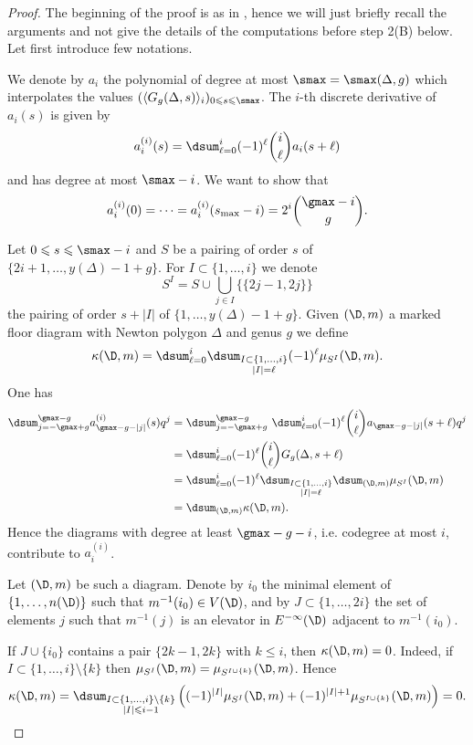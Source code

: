 \begin{proof}
The beginning of the proof is as in \cite[Theorem 1.7]{brugalle_polynomiality_2022}, hence we will just briefly recall the arguments and not give the details of the computations before step 2(B) below. Let first introduce few notations.

We denote by $a_i$ the polynomial of degree at most $\smax = \smax(\Delta,g)$ which interpolates the values $(\langle G_g(\Delta,s) \rangle_i)_{0 \leqslant s \leqslant \smax}$. The $i$-th discrete derivative of $a_i(s)$ is
given by
\[ a_i^{(i)}(s) = \dsum_{\ell=0}^i (-1)^\ell \binom{i}{\ell} a_i(s+\ell) \]
and has degree at most $\smax-i$. We want to show that 
\[ a_i^{(i)}(0) = \dots = a_i^{(i)}(s_{\max}-i) = 2^i \binom{\gmax-i}{g} .\]

	Let $0 \leqslant s \leqslant \smax-i$ and $S$ be a pairing of order $s$ of $\{ 2i+1,\dots,y(\Delta)-1+g \}$. For $I \subset \{1,\dots, i\}$ we denote 
\[ S^I = S \cup \bigcup_{j\in I} \{ \{ 2j-1,2j \}  \} \]
the pairing of order $s+|I|$ of $\{1,\dots,y(\Delta)-1+g\}$.
	Given $(\D,m)$ a marked floor diagram with Newton polygon $\Delta$ and genus $g$ we define
	\[ \kappa(\D,m) = \dsum_{\ell =0}^i \dsum_{\substack{I \subset \{1,\dots,i\} \\ |I| = \ell}} (-1)^\ell \mu_{S^I}(\D,m) .  \]
	One has
\begin{align*}
 \dsum_{j=-\gmax+g}^{\gmax-g} a^{(i)}_{\gmax-g-|j|}(s)q^j 
  &= \dsum_{j=-\gmax+g}^{\gmax-g} \   \dsum_{\ell=0}^i (-1)^\ell \binom{i}{\ell} a_{\gmax-g-|j|}(s+\ell) q^j   \\
  &= \dsum_{\ell=0}^i (-1)^\ell \binom{i}{\ell} G_g(\Delta,s+\ell)  \\
  &= \dsum_{\ell =0}^i  (-1)^\ell \dsum_{\substack{I \subset \{1,\dots,i\} \\ |I| = \ell}} \dsum_{(\D,m)} \mu_{S^I}(\D,m)  \\
  &= \dsum_{(\D,m)} \kappa(\D,m)  .
\end{align*}
 Hence the diagrams with degree at least $\gmax-g-i$, i.e.  codegree at most $i$, contribute to $a_i^{(i)}$.
	
	Let $(\D,m)$ be such a diagram. Denote by $i_0$ the minimal element of $\{1,\dots,n(\D)\}$ such that $m^{-1}(i_0) \in V(\D)$, and by $J \subset \{1,\dots,2i\}$ the set of elements $j$ such that $m^{-1}(j)$ is an elevator in $E^{-\infty}(\D)$ adjacent to $m^{-1}(i_0)$.


If $J\cup \{i_0\}$ contains a pair $\{2k-1,2k\}$ with $k\leqslant i$, then $\kappa(\D,m) = 0$.
Indeed, if $I \subset \{1,\dots,i\} \setminus \{k\}$ then $\mu_{S^I}(\D,m) = \mu_{S^{I\cup\{k\}}}(\D,m)$. Hence
\[ \kappa(\D,m) = \dsum_{\substack{I\subset\{1,\dots,i\}\setminus\{k\} \\ |I| \leqslant i-1}} \left((-1)^{|I|} \mu_{S^I}(\D,m)  + (-1)^{|I|+1} \mu_{S^{I\cup\{k\}}}(\D,m)  \right) = 0.   \]


\end{proof}

